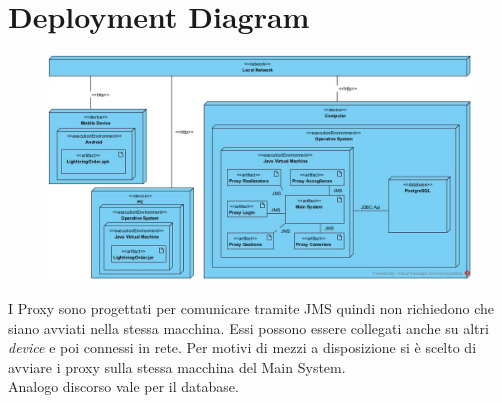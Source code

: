 \section{Deployment Diagram}
\begin{figure}[H]
	\centering
	\includegraphics[width=1\textwidth]{Immagini/deploy.jpg}
\end{figure}
I Proxy sono progettati per comunicare tramite JMS quindi non richiedono che siano avviati nella stessa macchina. Essi possono essere collegati anche su altri \textit{device} e poi connessi in rete. Per motivi di mezzi a disposizione si è scelto di avviare i proxy sulla stessa macchina del Main System.
\\Analogo discorso vale per il database.

